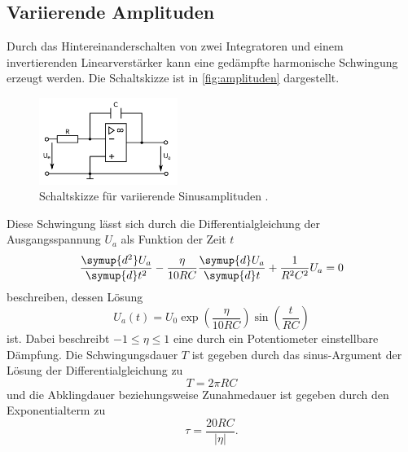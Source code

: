 \subsection{Variierende Amplituden}
Durch das Hintereinanderschalten von zwei Integratoren und einem invertierenden Linearverstärker
kann eine gedämpfte harmonische Schwingung erzeugt werden. Die Schaltskizze ist in
\autoref{fig:amplituden} dargestellt.
\begin{figure}[H]
    \centering
    \includegraphics[width=0.4\textwidth]{integrator.png}
    \caption{Schaltskizze für variierende Sinusamplituden \cite{anleitung}.}
    \label{fig:amplituden}
\end{figure}
Diese Schwingung lässt sich durch die Differentialgleichung der Ausgangsspannung $U_a$ als Funktion der Zeit $t$
\begin{equation*}
    \frac{\symup{d^2} U_a}{\symup{d} t^2} - \frac{\eta}{10 R C} \frac{\symup{d} U_a}{\symup{d} t} + \frac{1}{R^2 C^2} U_a = 0
\end{equation*}
beschreiben, dessen Lösung
\begin{equation*}
    U_a (t) = U_0 \exp \left( \frac{\eta}{10 R C} \right) \sin \left(\frac{t}{R C} \right)
\end{equation*}
ist.
Dabei beschreibt $ -1 \leq \eta \leq 1 $ eine durch ein Potentiometer einstellbare Dämpfung.
Die Schwingungsdauer $T$ ist gegeben durch das sinus-Argument der Lösung der Differentialgleichung zu
\begin{equation*}
    T = 2 \pi R C
\end{equation*}
und die Abklingdauer beziehungsweise Zunahmedauer ist gegeben durch den Exponentialterm zu
\begin{equation*}
    \tau = \frac{20 R C}{\vert \eta \vert}.
\end{equation*}
